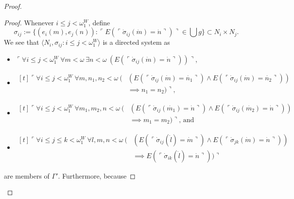 \documentclass[12pt, twoside]{memoir}
\numberwithin{equation}{section}
\theoremstyle{definition}
\theoremstyle{remark}
\theoremstyle{definition}
\theoremstyle{definition}
\theoremstyle{definition}
\theoremstyle{remark}
\begin{document}
\begin{proof}
\begin{proof}
Whenever $i \leq j < \omega_1^W$, define
\begin{equation*}
    \sigma_{ij} := \{(e_i(m), e_j(n)) : \ulcorner E(\ulcorner \dot{\sigma}_{ij}(\dot{m}) = \dot{n} \urcorner) \urcorner \in \bigcup g\} \subset N_i \times N_j \text{.}
\end{equation*}
We see that $\langle N_i, \sigma_{ij} : i \leq  j < \omega_1^{W} \rangle$ is a directed system as
\begin{itemize}
    \item $\ulcorner \forall i \leq j < \omega_1^W \ \forall m < \omega \ \exists n < \omega \ (E(\ulcorner \dot{\sigma}_{ij}(\dot{m}) = \dot{n} \urcorner)) \urcorner$,
    \item
    \!
    $\begin{aligned}[t]
        \ulcorner \forall i \leq j < \omega_1^W \ \forall m, n_1, n_2 < \omega \ ( & (E(\ulcorner \dot{\sigma}_{ij}(\dot{m}) = \dot{n_1} \urcorner) \wedge E(\ulcorner \dot{\sigma}_{ij}(\dot{m}) = \dot{n_2} \urcorner)) \\
        & \implies n_1 = n_2) \urcorner \text{,}
    \end{aligned}$
    \item
    \!
    $\begin{aligned}[t]
        \ulcorner \forall i \leq j < \omega_1^W \ \forall m_1, m_2, n < \omega \ ( & (E(\ulcorner \dot{\sigma}_{ij}(\dot{m_1}) = \dot{n} \urcorner) \wedge E(\ulcorner \dot{\sigma}_{ij}(\dot{m_2}) = \dot{n} \urcorner)) \\
        & \implies m_1 = m_2) \urcorner \text{, and}
    \end{aligned}$
    \item
    \!
    $\begin{aligned}[t]
        \ulcorner \forall i \leq j \leq k < \omega_1^W \ \forall l, m, n < \omega \ ( & (E(\ulcorner \dot{\sigma}_{ij}(\dot{l}) = \dot{m} \urcorner) \wedge E(\ulcorner \dot{\sigma}_{jk}(\dot{m}) = \dot{n} \urcorner)) \\
        & \implies E(\ulcorner \dot{\sigma}_{ik}(\dot{l}) = \dot{n} \urcorner)) \urcorner
    \end{aligned}$
\end{itemize}
are members of $\Gamma'$. Furthermore, because  
\end{proof}
\end{proof}
\end{document}
